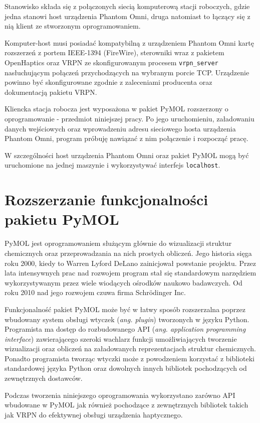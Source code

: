\documentclass[licencjacka]{pracamgr}
\begin{document}
Stanowisko składa się z połączonych siecią komputerową stacji roboczych, gdzie jedna stanowi host urządzenia Phantom Omni, druga natomiast to łączący się z nią klient ze stworzonym oprogramowaniem. 

Komputer-host musi posiadać kompatybilną z urządzeniem Phantom Omni kartę rozszerzeń z portem IEEE-1394 (FireWire), sterowniki wraz z pakietem OpenHaptics oraz VRPN ze skonfigurowanym procesem \texttt{vrpn\_server} nasłuchującym połączeń przychodzących na wybranym porcie TCP. Urządzenie powinno być skonfigurowane zgodnie z zaleceniami producenta oraz dokumentacją pakietu VRPN.

Kliencka stacja robocza jest wyposażona w pakiet PyMOL rozszerzony o oprogramowanie - przedmiot niniejszej pracy. Po jego uruchomieniu, załadowaniu danych wejściowych oraz wprowadzeniu adresu sieciowego hosta urządzenia Phantom Omni, program próbuję nawiązać z nim połączenie i rozpocząć pracę.

W szczególności host urządzenia Phantom Omni oraz pakiet PyMOL mogą być uruchomione na jednej maszynie i wykorzystywać interfejs \texttt{localhost}.

\section{Rozszerzanie funkcjonalności pakietu PyMOL}

PyMOL jest oprogramowaniem służącym głównie do wizualizacji struktur chemicznych oraz przeprowadzania na nich prostych obliczeń. Jego historia sięga roku 2000, kiedy to Warren Lyford DeLano zainicjował powstanie projektu. Przez lata intensywnych prac nad rozwojem program stał się standardowym narzędziem wykorzystywanym przez wiele wiodących ośrodków naukowo badawczych. Od roku 2010 nad jego rozwojem czuwa firma Schrödinger Inc.

Funkcjonalność pakiet PyMOL może być w łatwy sposób rozszerzalna poprzez wbudowany system obsługi wtyczek (\textit{ang. plugin}) tworzonych w języku Python. Programista ma dostęp do rozbudowanego API (\textit{ang. application programming interface}) zawierającego szeroki wachlarz funkcji umożliwiających tworzenie wizualizacji oraz obliczeń na załadowanych reprezentacjach struktur chemicznych. Ponadto programista tworząc wtyczki może z powodzeniem korzystać z biblioteki standardowej języka Python oraz dowolnych innych bibliotek pochodzących od zewnętrznych dostawców.

Podczas tworzenia niniejszego oprogramowania wykorzystano zarówno API wbudowane w PyMOL jak również pochodzące z zewnętrznych bibliotek takich jak VRPN do efektywnej obsługi urządzenia haptycznego.
\end{document}
